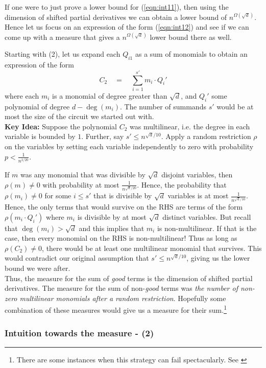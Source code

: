 \documentclass{beatcs}
\newcommand{\spaced}[1]{\quad#1\quad}
\begin{document}
If one were to just prove a lower bound for (\ref{eqn:int11}), then using the dimension of shifted partial derivatives we can obtain a lower bound of $n^{\Omega(\sqrt{d})}$. Hence let us focus on an expression of the form (\ref{eqn:int12}) and see if we can come up with a measure that gives a $n^{\Omega(\sqrt{d})}$ lower bound there as well. 

Starting with (2), let us expand each $Q_{i1}$ as a sum of monomials to obtain an expression of the form
\[
C_2 \spaced{=} \sum_{i=1}^{s'} m_i\cdot  Q_i'
\]
where each $m_i$ is a monomial of degree greater than $\sqrt{d}$, and $Q_i'$ some polynomial of degree $d - \deg(m_i)$. The number of summands $s'$ would be at most the size of the circuit we started out with.\\

{\bf Key Idea:} Suppose the polynomial $C_2$ was multilinear, i.e. the degree in each variable is bounded by $1$.  Further, say $s' \leq n^{\sqrt{d}/10}$. Apply a random restriction $\rho$ on the variables by setting each variable independently to zero with probability $p < \frac{1}{n^{1/20}}$. 

If $m$ was any monomial that was divisible by $\sqrt{d}$ disjoint variables, then $\rho(m) \neq 0$ with probability at most $\frac{1}{n^{\sqrt{d}/20}}$. Hence, the probability that $\rho(m_i) \neq 0$ for some $i\leq s'$ that is divisible  by $\sqrt{d}$ variables is at most $\frac{1}{n^{\sqrt{d}/10}}$. Hence, the only terms that would survive on the RHS are terms of the form $\rho(m_i \cdot Q_i')$ where $m_i$ is divisible by at most $\sqrt{d}$ distinct variables. But recall that $\deg(m_i) > \sqrt{d}$ and this implies that $m_i$ is non-multilinear. If that is the case, then every monomial on the RHS is non-multilinear! Thus as long as $\rho(C_2) \neq 0$, there would be at least one multilinear monomial that survives. This would contradict our original assumption that $s' \leq n^{\sqrt{d}/10}$, giving us the lower bound we were after. \\

Thus, the measure for the sum of \emph{good} terms is the dimension of shifted partial derivatives. The measure for the sum of non-\emph{good} terms was \emph{the number of non-zero multilinear monomials after a random restriction}. Hopefully some combination of these measures would give us a measure for their sum.\footnote{There are some instances when this strategy can fail spectacularly. See \cite{KS14a}}

\subsubsection*{Intuition towards the measure - (2)}
\end{document}
